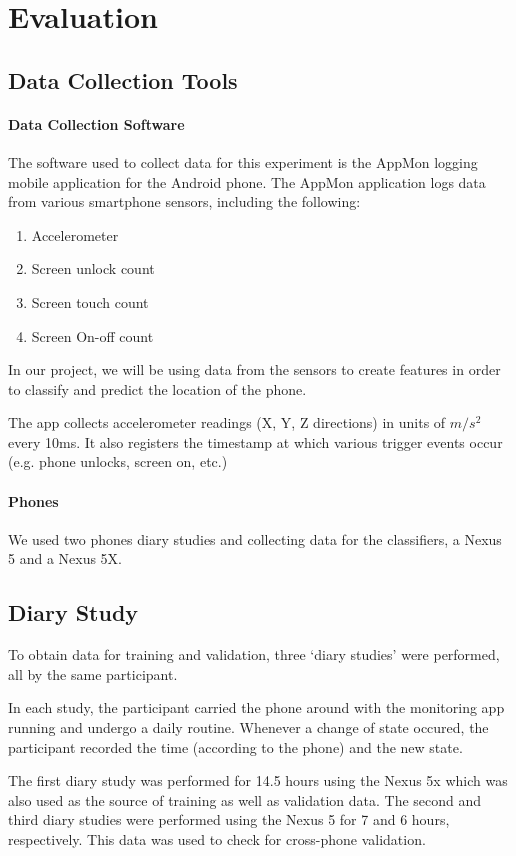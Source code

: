 \section{Evaluation}

\subsection{Data Collection Tools}
\paragraph{Data Collection Software}
The software used to collect data for this experiment is the AppMon logging mobile application 
for the Android phone. 
The AppMon application logs data from various smartphone sensors, including the following:
\begin{enumerate}
\item Accelerometer
\item Screen unlock count
\item Screen touch count
\item Screen On-off count
\end{enumerate}

In our project, we will be using data from the sensors
to create features in order to classify and predict the location of the phone. 

The app collects accelerometer readings (X, Y, Z directions) in units of $m/s^2$ every 10ms.
It also registers the timestamp at which various trigger events occur (e.g. phone unlocks, screen on, etc.)

\paragraph{Phones}
We used two phones diary studies and collecting data for the classifiers,
 a Nexus 5 and a Nexus 5X.


\subsection {Diary Study}
To obtain data for training and validation, three `diary studies' were performed, all by the same participant.

In each study, the participant carried the phone around with the monitoring app running and undergo a daily routine.
Whenever a change of state occured, the participant recorded the time (according to the phone) and the new state.

The first diary study was performed for 14.5 hours using the Nexus 5x which was also used as the source of training as well as validation data.
The second and third diary studies were performed using the Nexus 5 for 7 and 6 hours, respectively.
This data was used to check for cross-phone validation.


